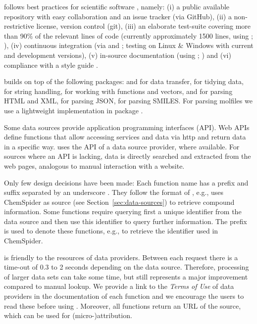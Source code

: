 \documentclass[article]{jss}
\begin{document}
 follows best practices for scientific software
\citep{wilson_best_2014, poisot_best_2015}, namely: (i) a public
available repository with easy collaboration and an issue tracker (via
GitHub), (ii) a non-restrictive license, version control (git), (iii)
an elaborate test-suite covering more than 90\% of the relevant lines
of code (currently approximately 1500 lines, using ;
\citealt{wickham_testthat:_2011}), (iv) continuous integration (via
\citet{travis-ci} and \citet{appveyor}; testing on Linux \& Windows
with current and development  versions), (v) in-source
documentation (using ; \citealt{wickham_roxygen2})
and (vi) compliance with a style guide \citep{wickham_advanced_2015}.

 builds on top of the following  packages:
 \citep{lang_rcurl:_2015} and 
\citep{wickham_httr} for data transfer,  \citep{wickham_dplyr} for tidying data, 
\citep{wickham_stringr:_2015} for string handling,  \citep{wickham_purrr} for working with functions and vectors, 
\citep{wickham_xml2} and  \citep{wickham_rvest} for parsing
HTML and XML,  \citep{ooms_jsonlite_2014} for parsing
JSON,  \citep{guha_rcdk} for parsing SMILES.  For parsing
molfiles we use a lightweight implementation in package 
\citep{Grabner_Varmuza_Dehmer_2012}.

Some data sources provide application programming interfaces (API).
Web APIs define functions that allow accessing services and data via
http and return data in a specific way.   uses the API of
a data source provider, where available.  For sources where an API is
lacking, data is directly searched and extracted from the web pages,
analogous to manual interaction with a website.

Only few design decisions have been made: Each function name has a
prefix and suffix separated by an underscore
\citep{Chamberlain_Szocs_2013}.  They follow the format of
, e.g.,  uses ChemSpider as
source (see Section~\ref{sec:data-sources}) to retrieve compound
information.  Some functions require querying first a unique
identifier from the data source and then use this identifier to query
further information.  The prefix  is used to denote these
functions, e.g.,  to retrieve the identifier used in
ChemSpider.

 is friendly to the resources of data providers.  Between
each request there is a time-out of 0.3 to 2 seconds depending on the
data source.  Therefore, processing of larger data sets can take some
time, but still represents a major improvement compared to manual
lookup.  We provide a link to the \emph{Terms of Use} of data
providers in the documentation of each function and we encourage the
users to read these before using .  Moreover, all
functions return an URL of the source, which can be used for
\mbox{(micro-)attribution}.
\end{document}
